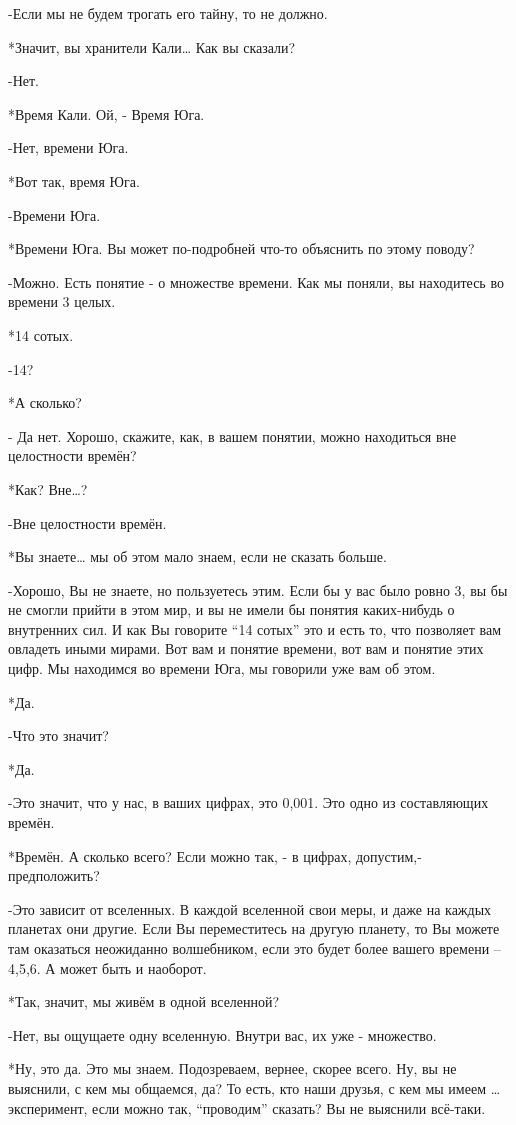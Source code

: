 -Если мы не будем трогать его тайну, то не должно.

*Значит, вы хранители Кали… Как вы сказали?

-Нет.

 *Время Кали. Ой, - Время Юга.

-Нет, времени Юга.

*Вот так, время Юга.

-Времени Юга.

*Времени Юга. Вы может по-подробней что-то объяснить по этому поводу?

-Можно. Есть понятие - о множестве времени. Как мы поняли, вы находитесь во времени 3 целых.

*14 сотых.

-14?

*А сколько?

 - Да нет. Хорошо, скажите, как, в вашем понятии, можно находиться вне целостности времён?

*Как? Вне…?

-Вне целостности времён.

*Вы знаете… мы об этом мало знаем, если не сказать больше.

-Хорошо, Вы не знаете, но пользуетесь этим. Если бы у вас было ровно 3, вы бы не смогли прийти в этом мир, и вы не имели бы понятия   каких-нибудь о внутренних сил. И как Вы говорите “14 сотых” это и есть то, что позволяет вам овладеть иными мирами. Вот вам и понятие времени, вот вам и понятие этих цифр. Мы  находимся во времени Юга, мы говорили уже вам об этом. 

*Да.

-Что это значит?

*Да.

-Это значит, что у нас, в ваших цифрах, это 0,001. Это одно из составляющих времён.

*Времён. А сколько всего? Если можно так, - в цифрах, допустим,-  предположить?

-Это зависит от вселенных. В каждой вселенной свои меры, и даже на каждых планетах они другие. Если Вы переместитесь на другую планету, то Вы можете там оказаться неожиданно волшебником, если это будет более вашего времени – 4,5,6. А может быть и наоборот.

*Так, значит, мы живём в одной вселенной?

-Нет, вы ощущаете одну вселенную. Внутри вас, их уже - множество.

*Ну, это да. Это мы знаем. Подозреваем, вернее, скорее всего. Ну, вы не выяснили, с кем мы общаемся, да? То есть, кто наши друзья, с кем мы имеем … эксперимент, если можно так, “проводим” сказать? Вы не выяснили всё-таки.

